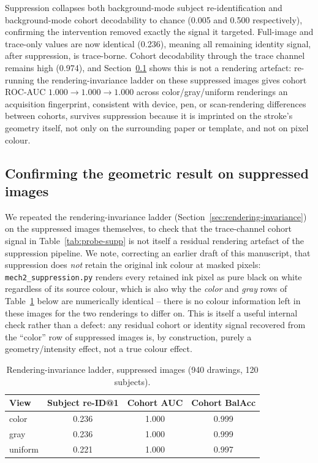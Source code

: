 \documentclass[3p,final,10pt]{elsarticle}
\let\oldsubsection\subsection
\renewcommand{\subsection}{\FloatBarrier\oldsubsection}
\begin{document}
Suppression collapses both background-mode subject re-identification and
background-mode cohort decodability to chance (0.005 and 0.500
respectively), confirming the intervention removed exactly the signal it
targeted. Full-image and trace-only values are now identical (0.236),
meaning all remaining identity signal, after suppression, is trace-borne.
Cohort decodability through the trace channel remains high (0.974), and
Section~\ref{sec:rendering-invariance2} shows this is not a rendering
artefact: re-running the rendering-invariance ladder on these suppressed
images gives cohort ROC-AUC $1.000\to1.000\to1.000$ across
color/gray/uniform renderings an acquisition fingerprint, consistent
with device, pen, or scan-rendering differences between cohorts, survives
suppression because it is imprinted on the stroke's geometry itself, not
only on the surrounding paper or template, and not on pixel colour.

\subsection{Confirming the geometric result on suppressed images}
\label{sec:rendering-invariance2}
We repeated the rendering-invariance ladder (Section~\ref{sec:rendering-invariance})
on the suppressed images themselves, to check that the trace-channel
cohort signal in Table~\ref{tab:probe-supp} is not itself a residual
rendering artefact of the suppression pipeline. We note, correcting an
earlier draft of this manuscript, that suppression does \emph{not} retain
the original ink colour at masked pixels: \texttt{mech2\_suppression.py}
renders every retained ink pixel as pure black on white regardless of its
source colour, which is also why the \textit{color} and \textit{gray}
rows of Table~\ref{tab:rendering-supp} below are numerically identical --
there is no colour information left in these images for the two renderings
to differ on. This is itself a useful internal check rather than a defect:
any residual cohort or identity signal recovered from the ``color'' row of
suppressed images is, by construction, purely a geometry/intensity effect,
not a true colour effect.

\begin{table}[H]
\centering
\caption{Rendering-invariance ladder, suppressed images (940 drawings, 120
subjects).}
\label{tab:rendering-supp}
\begin{tabular}{lccc}
\toprule
View & Subject re-ID@1 & Cohort AUC & Cohort BalAcc \\
\midrule
color   & 0.236 & 1.000 & 0.999 \\
gray    & 0.236 & 1.000 & 0.999 \\
uniform & 0.221 & 1.000 & 0.997 \\
\bottomrule
\end{tabular}
\end{table}
\end{document}
